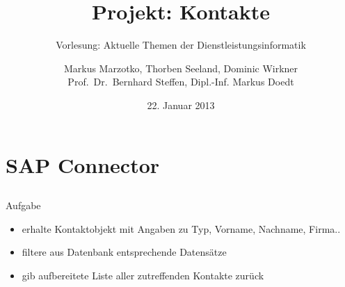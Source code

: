 \documentclass[xcolor={usenames,dvipsnames}, compress, 10pt]{beamer}
\begin{document}
\title[DLI Projekt: Kontakte]{Projekt: Kontakte}
\subtitle[DLI]{Vorlesung: Aktuelle Themen der Dienstleistungsinformatik}
\date{22. Januar 2013}
\author[Marzotko, Seeland, Wirkner]{Markus Marzotko, Thorben Seeland, Dominic Wirkner\\ {\scriptsize Prof.\ Dr.\ Bernhard Steffen, Dipl.-Inf. Markus Doedt}} 

\nocite{*}

\frame{\titlepage}

\begin{frame}
\tableofcontents
\end{frame}			



\section{SAP Connector}

\subsection*{}

\begin{frame}{Aufgabe}
\begin{center}

\begin{itemize}
\item erhalte Kontaktobjekt mit Angaben zu Typ, Vorname, Nachname, Firma..
\item filtere aus Datenbank entsprechende Datensätze
\item gib aufbereitete Liste aller zutreffenden Kontakte zurück
\end{itemize}

\end{center}
\end{frame}

\subsection*{}
\end{document}
